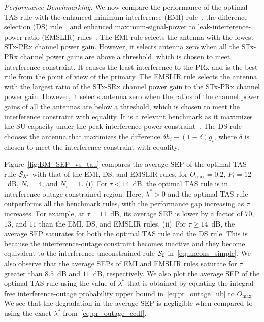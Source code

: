 \documentclass[12pt,draftcls,peerreview,onecolumn]{IEEEtran}
\newcommand{\lam}{\lambda}
\newcommand{\lamstar}{\lam^{*}}
\newcommand{\Nt}{{N_t}}
\newcommand{\Nr}{{N_r}}
\newcommand{\Pt}{{P_t}}
\newcommand{\such}{h}
\newcommand{\puch}{g}
\newcommand{\hk}[1]{{\such_{#1}}}
\newcommand{\gk}[1]{{\puch_{#1}}}
\newcommand{\outmax}{O_{\text{max}}}
\newcommand{\itau}{\tau}
\newcommand{\caluncons}{{\cal S_{\text{0}}}}
\newcommand{\callamstarrule}{\cal S_{\lam^{*}}}
\begin{document}
{\em Performance Benchmarking:} We now compare the performance of the optimal TAS rule with the enhanced minimum interference (EMI) rule~\cite{Sarvendranath_2013_TCOM}, the difference selection (DS) rule~\cite{Wang_2011_TCom},  and enhanced maximum-signal-power to leak-interference-power-ratio (EMSLIR) rules~\cite{Sarvendranath_2013_TCOM}.  The EMI rule selects the antenna with the lowest STx-PRx channel power gain. However, it selects antenna zero when all the STx-PRx channel power gains are above a threshold, which is chosen to meet interference constraint. It causes the least interference to the PRx and is the best rule from the point of view of the primary. The EMSLIR rule selects the antenna with the largest ratio of the STx-SRx channel power gain to the STx-PRx channel power gain. However, it selects antenna zero when the ratios of the channel power gains of all the antennas are below a threshold, which is chosen to meet the interference constraint with equality. It is a relevant benchmark as it maximizes the SU capacity under the peak interference power constraint~\cite{Wang_2010_TWC}. The DS rule chooses the antenna that maximizes the difference $\delta \hk{i} -(1-\delta) \gk{i} $, where $\delta$ is chosen to meet the interference constraint with equality.   

Figure~\ref{fig:BM_SEP_vs_tau} compares the average SEP of the optimal TAS rule $\callamstarrule$ with that of the EMI, DS, and EMSLIR rules, for $\outmax = 0.2$, $\Pt = 12$~dB, $\Nt = 4$, and $\Nr=1$. (i)~For $\itau < 14$~dB, the optimal TAS rule is in interference-outage constrained region. Here, $\lamstar>0$ and the optimal TAS rule outperforms all the benchmark rules, with the performance gap increasing as $\itau$ increases. For example, at $\itau=11$~dB,  its average SEP is lower by a factor of $70$, $13$, and $11$ than the EMI, DS, and EMSLIR rules. (ii)~For $\itau \geq 14$~dB, the average SEP saturates for both the optimal TAS rule and the DS rule. This is because the interference-outage constraint becomes inactive and they become equivalent to the interference unconstrained rule $\caluncons$ in~\eqref{eq:uncons_simple}. We also observe that the average SEPs of EMI and EMSLIR rules saturate for $\itau$ greater than $8.5$~dB and $11$~dB, respectively. We also plot the average SEP of the optimal TAS rule using the value of $\lamstar$ that is obtained by equating the integral-free interference-outage probability upper bound in~\eqref{eq:pr_outage_ub} to $\outmax$. We see that the degradation in the average SEP  is negligible when compared to using the exact $\lamstar$ from~\eqref{eq:pr_outage_ccdf}. 
\end{document}
